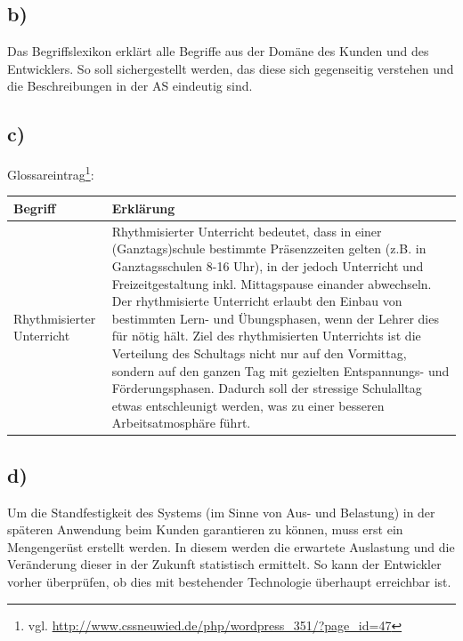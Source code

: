\documentclass{swp1}
\begin{document}
\subsection*{b)}
Das Begriffslexikon erklärt alle Begriffe aus der Domäne des Kunden und des Entwicklers. So soll
sichergestellt werden, das diese sich gegenseitig verstehen und die Beschreibungen in der AS eindeutig sind.\\
\subsection*{c)}
Glossareintrag\footnote{vgl. \url{http://www.cssneuwied.de/php/wordpress_351/?page_id=47}}:

\begin{tabular}{|p{5cm}|p{10cm}|}\hline
   \textbf{Begriff} & \textbf{Erklärung}\\ \hline \hline
   Rhythmisierter Unterricht & Rhythmisierter Unterricht bedeutet, dass  in einer (Ganztags)schule bestimmte Präsenzzeiten gelten (z.B. in Ganztagsschulen 8-16 Uhr), in der jedoch Unterricht und Freizeitgestaltung inkl. Mittagspause einander abwechseln. Der rhythmisierte Unterricht erlaubt den Einbau von bestimmten Lern- und Übungsphasen, wenn der Lehrer dies für nötig hält. Ziel des rhythmisierten Unterrichts ist die Verteilung des Schultags nicht nur auf den Vormittag, sondern auf den ganzen Tag mit gezielten Entspannungs- und Förderungsphasen. Dadurch soll der stressige Schulalltag etwas entschleunigt werden, was zu einer besseren Arbeitsatmosphäre führt. \\ \hline

 \end{tabular}

\subsection*{d)}
Um die Standfestigkeit des Systems (im Sinne von Aus- und Belastung) in der späteren
Anwendung beim Kunden garantieren zu können, muss erst ein Mengengerüst erstellt werden. In diesem werden die erwartete Auslastung und die Veränderung dieser in der Zukunft statistisch
ermittelt. So kann der Entwickler vorher überprüfen, ob dies mit bestehender Technologie
überhaupt erreichbar ist.
\end{document}
